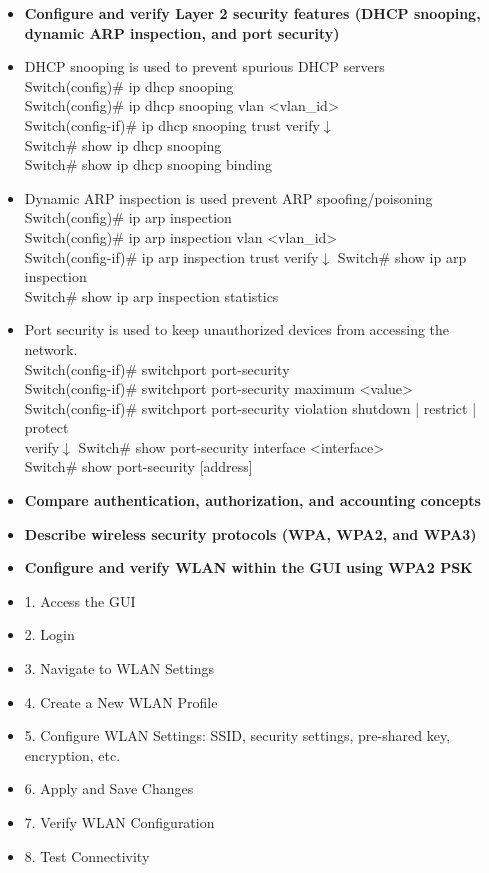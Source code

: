 \documentclass{article}
\begin{document}
\begin{itemize}
  \item \textbf{Configure and verify Layer 2 security features (DHCP snooping, dynamic ARP inspection, and port security)}
  	\item[] DHCP snooping is used to prevent spurious DHCP servers\\
  		Switch(config)\# ip dhcp snooping\\
		Switch(config)\# ip dhcp snooping vlan \textless vlan\_id\textgreater\\
		Switch(config-if)\# ip dhcp snooping trust
		verify$\downarrow$\\
		Switch\# show ip dhcp snooping\\
		Switch\# show ip dhcp snooping binding
  	\item[] Dynamic ARP inspection is used prevent ARP spoofing/poisoning\\
  		Switch(config)\# ip arp inspection\\
		Switch(config)\# ip arp inspection vlan \textless vlan\_id\textgreater\\
		Switch(config-if)\# ip arp inspection trust
		verify$\downarrow$
		Switch\# show ip arp inspection\\
		Switch\# show ip arp inspection statistics
  	\item[] Port security is used to keep unauthorized devices from accessing the network.\\
  		Switch(config-if)\# switchport port-security\\
		Switch(config-if)\# switchport port-security maximum \textless value\textgreater\\
		Switch(config-if)\# switchport port-security violation {shutdown | restrict | protect}\\
		verify$\downarrow$
		Switch\# show port-security interface \textless interface\textgreater\\
		Switch\# show port-security [address]
  \item \textbf{Compare authentication, authorization, and accounting concepts}
  \item \textbf{Describe wireless security protocols (WPA, WPA2, and WPA3)}
  \item \textbf{Configure and verify WLAN within the GUI using WPA2 PSK}
	\item[] 1. Access the GUI
	\item[] 2. Login
	\item[] 3. Navigate to WLAN Settings
	\item[] 4. Create a New WLAN Profile
	\item[] 5. Configure WLAN Settings: SSID, security settings, pre-shared key, encryption, etc.
	\item[] 6. Apply and Save Changes
	\item[] 7. Verify WLAN Configuration
	\item[] 8. Test Connectivity

\end{itemize}
\end{document}
